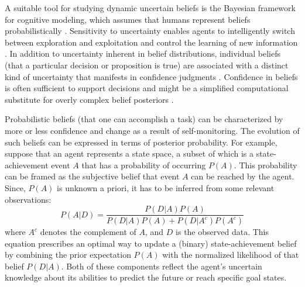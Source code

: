 A suitable tool for studying dynamic uncertain beliefs is the Bayesian framework for cognitive modeling, which assumes that humans represent beliefs probabilistically \cite{sun_bayesian_2008,perfors_tutorial_2011,coenen_asking_2019}. Sensitivity to uncertainty enables agents to intelligently switch between exploration and exploitation \cite{cohen_should_2007} and control the learning of new information \cite{meyniel_confidence_2015}. In addition to uncertainty inherent in belief distributions, individual beliefs (that a particular decision or proposition is true) are associated with a distinct kind of uncertainty that manifests in confidence judgments \cite{pouget_confidence_2016}. Confidence in beliefs is often sufficient to support decisions and might be a simplified computational substitute for overly complex belief posteriors \cite{pouget_confidence_2016}.  

Probabilistic beliefs (that one can accomplish a task) can be characterized by more or less confidence and change as a result of self-monitoring. The evolution of such beliefs can be expressed in terms of posterior probability. For example, suppose that an agent represents a state space, a subset of which is a state-achievement event $A$ that has a probability of occurring $P(A)$. This probability can be framed as the subjective belief that event $A$ can be reached by the agent. Since, $P(A)$ is unknown a priori, it has to be inferred from some relevant observations:
\begin{equation}
    P(A|D) = \frac{P(D|A) P(A)}{P(D|A)P(A) + P(D|A^c)P(A^c)}
\end{equation}
where $A^c$ denotes the complement of $A$, and $D$ is the observed data. This equation prescribes an optimal way to update a (binary) state-achievement belief by combining the prior expectation $P(A)$ with the normalized likelihood of that belief $P(D|A)$. Both of these components reflect the agent's uncertain knowledge about its abilities to predict the future or reach specific goal states.

